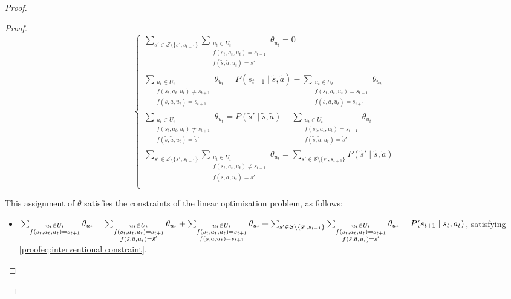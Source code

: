 \begin{proof}
\begin{proof}
\[\begin{cases}
    \sum_{s' \in \mathcal{S}\setminus\{\tilde{s}', s_{t+1}\}}\sum_{\substack{u_t \in U_t \\f(s_t, a_t, u_t) = s_{t+1} \\ f(\tilde{s}, \tilde{a}, u_t) = s'}}{\theta_{u_t}} = 0\\
    
    \sum_{\substack{u_t \in U_t \\f(s_t, a_t, u_t) \neq s_{t+1} \\ f(\tilde{s}, \tilde{a}, u_t) = s_{t+1}}}{\theta_{u_t}} = P(s_{t+1} \mid \tilde{s}, \tilde{a}) - \sum_{\substack{u_t \in U_t \\f(s_t, a_t, u_t) = s_{t+1} \\ f(\tilde{s}, \tilde{a}, u_t) = s_{t+1}}}{\theta_{u_t}} \\
    
    \sum_{\substack{u_t \in U_t \\f(s_t, a_t, u_t) \neq s_{t+1} \\ f(\tilde{s}, \tilde{a}, u_t) = \tilde{s}'}}{\theta_{u_t}} = P(\tilde{s}' \mid \tilde{s}, \tilde{a}) - \sum_{\substack{u_t \in U_t \\f(s_t, a_t, u_t) = s_{t+1} \\ f(\tilde{s}, \tilde{a}, u_t) = \tilde{s}'}}{\theta_{u_t}} \\
    
    \sum_{s' \in \mathcal{S}\setminus\{\tilde{s}', s_{t+1}\}}\sum_{\substack{u_t \in U_t \\f(s_t, a_t, u_t) \neq s_{t+1} \\ f(\tilde{s}, \tilde{a}, u_t) = s'}}{\theta_{u_t}} = \sum_{s' \in \mathcal{S}\setminus\{\tilde{s}', s_{t+1}\}}P(\tilde{s}' \mid \tilde{s}, \tilde{a})\\
\end{cases}
\]

This assignment of $\theta$ satisfies the constraints of the linear optimisation problem, as follows:

\begin{itemize}        
    \item $\sum_{\substack{u_t \in U_t \\f(s_t, a_t, u_t) = s_{t+1}}} \theta_{u_t} = \sum_{\substack{u_t \in U_t \\f(s_t, a_t, u_t) = s_{t+1} \\ f(\tilde{s}, \tilde{a}, u_t) = \tilde{s}'}} \theta_{u_t} + \sum_{\substack{u_t \in U_t \\f(s_t, a_t, u_t) = s_{t+1} \\ f(\tilde{s}, \tilde{a}, u_t) = s_{t+1}}} \theta_{u_t} + \sum_{s' \in \mathcal{S}\setminus\{\tilde{s}', s_{t+1}\}}\sum_{\substack{u_t \in U_t \\f(s_t, a_t, u_t) = s_{t+1} \\ f(\tilde{s}, \tilde{a}, u_t) = s'}}{\theta_{u_t}} \\ = P(s_{t+1} \mid s_t, a_t)$, satisfying \eqref{proofeq:interventional constraint}.


\end{itemize}
\end{proof}
\end{proof}
